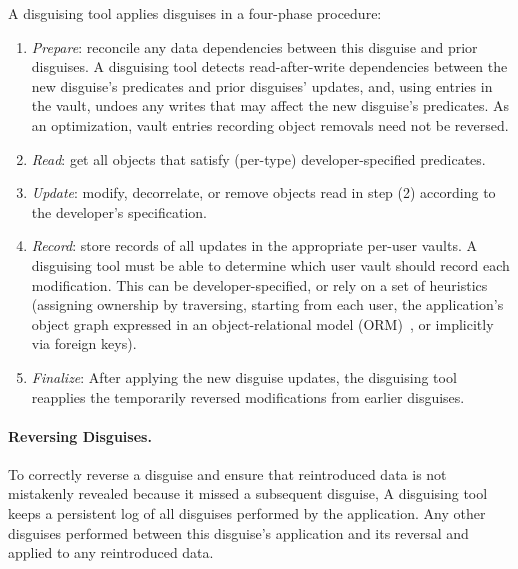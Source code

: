 A disguising tool applies disguises in a four-phase procedure:
\begin{enumerate}[nosep]
    \item \emph{Prepare}: reconcile any data dependencies between this disguise and prior disguises.
            A disguising tool detects read-after-write dependencies between the new disguise's predicates and prior disguises'
            updates, and, using entries in the vault, undoes any writes that may affect the new disguise's predicates. As an
            optimization, vault entries recording object removals need not be reversed.
        \item \emph{Read}: get all objects that satisfy (per-type) developer-specified predicates.
        \item \emph{Update}: modify, decorrelate, or remove objects read in step (2) according to the
        developer's specification.
    \item \emph{Record}: store records of all updates in the appropriate per-user vaults. A
        disguising tool
        must be able to determine which user vault should record each modification. This can be
        developer-specified, or rely on a set of heuristics (\eg assigning ownership by traversing,
        starting from each user, the application's object graph expressed in an object-relational
        model (ORM)~\cite{orm}, or implicitly via foreign keys).
        \item \emph{Finalize}: After applying the new disguise updates, the disguising tool reapplies the temporarily reversed modifications from earlier disguises.
\end{enumerate}

\paragraph{Reversing Disguises.}
To correctly reverse a disguise and ensure that reintroduced data is not mistakenly revealed because
it missed a subsequent disguise, A disguising tool keeps a persistent log of all disguises performed by the
application. Any other disguises performed between this disguise's application and its reversal and
applied to any reintroduced data.
